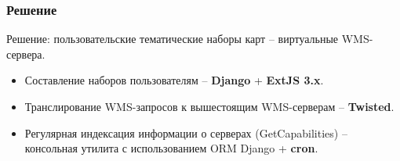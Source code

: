 \begin{frame}
  \frametitle{Решение}
  
  Решение: пользовательские тематические наборы карт -- виртуальные
  WMS-сервера.

  \begin{itemize}
  \item Составление наборов пользователям -- \textbf{Django} +
    \textbf{ExtJS 3.x}.
  \item Транслирование WMS-запросов к вышестоящим WMS-серверам -- \textbf{Twisted}.
  \item Регулярная индексация информации о серверах (GetCapabilities)
    -- консольная утилита с использованием ORM Django + \textbf{cron}.
  \end{itemize}
\end{frame}
